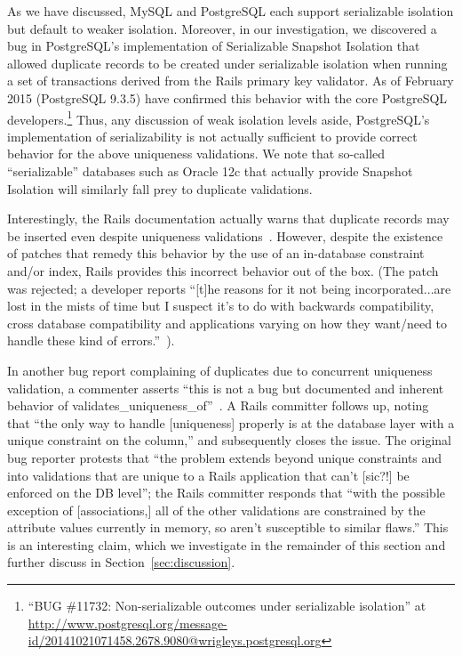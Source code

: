 As we have discussed, MySQL and PostgreSQL each support serializable
isolation but default to weaker isolation. Moreover, in our
investigation, we discovered a bug in PostgreSQL's implementation of
Serializable Snapshot Isolation that allowed duplicate records to be
created under serializable isolation when running a set of
transactions derived from the Rails primary key validator. As of
February 2015 (PostgreSQL 9.3.5) have confirmed this behavior with the
core PostgreSQL developers.\footnote{``BUG \#11732: Non-serializable
  outcomes under serializable isolation'' at \url{http://www.postgresql.org/message-id/20141021071458.2678.9080@wrigleys.postgresql.org}\label{fn:pg-bug}} Thus, any discussion of weak isolation
levels aside, PostgreSQL's implementation of serializability is not
actually sufficient to provide correct behavior for the above
uniqueness validations. We note that so-called ``serializable''
databases such as Oracle 12c that actually provide Snapshot Isolation
will similarly fall prey to duplicate validations.

Interestingly, the Rails documentation actually warns that duplicate
records may be inserted even despite uniqueness
validations~\cite{rails-guide}. However, despite the existence of
patches that remedy this behavior by the use of an in-database
constraint and/or index, Rails provides this incorrect behavior out of
the box. (The patch was rejected; a developer reports ``[t]he reasons
for it not being incorporated...are lost in the mists of time but I
suspect it's to do with backwards compatibility, cross database
compatibility and applications varying on how they want/need to handle
these kind of errors.''~\cite{code-index-patch}).

In another bug report complaining of duplicates due to concurrent
uniqueness validation, a commenter asserts ``this is not a bug but
documented and inherent behavior of
validates\_uniqueness\_of''~\cite{code-index-error}.  A Rails
committer follows up, noting that ``the only way to handle
[uniqueness] properly is at the database layer with a unique
constraint on the column,'' and subsequently closes the issue. The
original bug reporter protests that ``the problem extends beyond
unique constraints and into validations that are unique to a Rails
application that can't [sic?!]  be enforced on the DB level''; the
Rails committer responds that ``with the possible exception of
[associations,] all of the other validations are constrained by the
attribute values currently in memory, so aren't susceptible to similar
flaws.'' This is an interesting claim, which we investigate in the
remainder of this section and further discuss in
Section~\ref{sec:discussion}.

